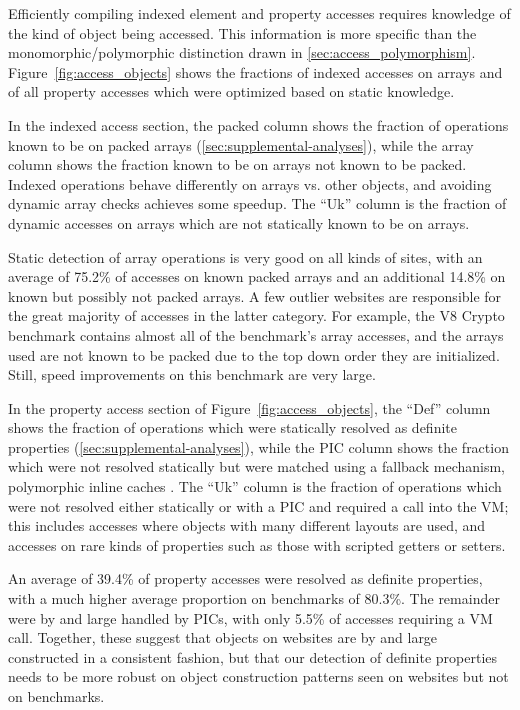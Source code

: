 Efficiently compiling indexed element and property accesses requires
knowledge of the kind of object being accessed.
This information is more specific than the monomorphic/polymorphic
distinction drawn in \Section\ref{sec:access_polymorphism}.
Figure~\ref{fig:access_objects} shows the fractions of indexed accesses on arrays
and of all property accesses which were optimized based on static knowledge.

In the indexed access section, the packed column shows the fraction
of operations known to be on packed arrays (\Section\ref{sec:supplemental-analyses}),
while the array column shows the fraction known to be on arrays not
known to be packed.
Indexed operations behave differently on arrays vs. other objects,
and avoiding dynamic array checks achieves some speedup.
The ``Uk'' column is the fraction of dynamic accesses on arrays which
are not statically known to be on arrays.

Static detection of array operations is very good on all kinds of sites,
with an average of 75.2\% of accesses on known packed arrays and
an additional 14.8\% on known but possibly not packed arrays.
A few outlier websites are responsible for the great majority of
accesses in the latter category.
For example, the V8 Crypto benchmark contains almost all of the benchmark's
array accesses, and the arrays used are not known to be packed
due to the top down order they are initialized.
Still, speed improvements on this benchmark are very large.

In the property access section of Figure~\ref{fig:access_objects},
the ``Def'' column shows the fraction
of operations which were statically resolved as definite properties
(\Section\ref{sec:supplemental-analyses}), while the PIC column shows the fraction which
were not resolved statically but were matched using a fallback mechanism,
polymorphic inline caches \cite{Holzle91}.
The ``Uk'' column is the fraction of operations which were not resolved
either statically or with a PIC and required a call into the VM;
this includes accesses where objects
with many different layouts are used, and accesses on rare kinds of
properties such as those with scripted getters or setters.

An average of 39.4\% of property accesses were resolved as definite properties,
with a much higher average proportion on benchmarks of 80.3\%.
The remainder were by and large handled by PICs, with only 5.5\% of
accesses requiring a VM call.
Together, these suggest that objects on websites are by and large
constructed in a consistent fashion, but that
our detection of definite properties needs
to be more robust on object construction patterns seen on websites but
not on benchmarks.

